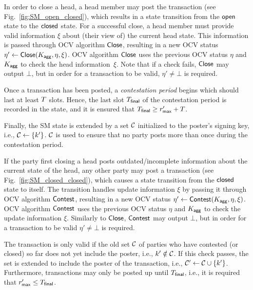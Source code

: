 


 In order to close a head, a head
member may post the \mtxClose{} transaction (see
Fig.~\ref{fig:SM_open_closed}), which results in a state transition
from the $\mathsf{open}$ state to the $\mathsf{closed}$ state.  For a successful
close, a head member must provide valid information $\xi$ about (their
view of) the current head state.  This information is passed through
OCV algorithm $\mathsf{Close}$, resulting in a new OCV status
$\eta' \gets \mathsf{Close}(K_{\mathsf{agg}},\eta,\xi)$.  OCV algorithm $\mathsf{Close}$
uses the previous OCV status $\eta$ and $K_{\mathsf{agg}}$ to check the head
information~$\xi$.  Note that if a check fails, $\mathsf{Close}$ may output
$\bot$, but in order for a \mtxClose{} transaction to be valid,
$\eta' \neq \bot$ is required.

Once a \mtxClose{} transaction has been posted, a \emph{contestation period}
begins which should last at least $T$ slots.  Hence, the last slot
$T_{\mathsf{final}}$ of the contestation period is recorded in the state, and it
is ensured that $T_{\mathsf{final}} \geq r_{\mathsf{max}}' + T$.

Finally, the SM state is extended by a set $\mathcal C$
initialized to the poster's signing key, i.e.,
$\mathcal C \gets \{k'\}$.   $\mathcal C$ is used to ensure that no party
posts more than once during the contestation period.





 If the party first closing a head posts
outdated/incomplete information about the current state of the head,
any other party may post a \mtxContest{} transaction (see
Fig.~\ref{fig:SM_closed_closed}), which causes a state transition from
the $\mathsf{closed}$ state to itself.  The transition handles update
information $\xi$ by passing it through OCV algorithm $\mathsf{Contest}$,
resulting in a new OCV status
$\eta' \gets \mathsf{Contest} (K_{\mathsf{agg}},\eta,\xi)$.  OCV algorithm
$\mathsf{Contest}$ uses the previous OCV status $\eta$ and $K_{\mathsf{agg}}$ to check
the update information $\xi$.  Similarly to $\mathsf{Close}$, $\mathsf{Contest}$
may output $\bot$, but in order for a \mtxContest{} transaction to be
valid $\eta' \neq \bot$ is required.

The \mtxContest{} transaction is only valid if the old set
$\mathcal C$ of parties who have contested (or closed) so far does not yet
include the poster, i.e., $k' \notin \mathcal C$.  If this check
passes, the set is extended to include the poster of the \mtxContest{}
transaction, i.e., $\mathcal C' \gets \mathcal C \cup \{k'\}$.
Furthermore, \mtxContest{} transactions may only be posted up until
$T_{\mathsf{final}}$, i.e., it is required that $r_{\mathsf{max}}' \leq T_{\mathsf{final}}$.

